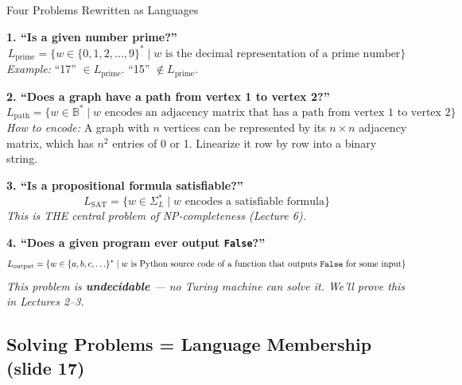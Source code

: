 \documentclass[11pt,a4paper]{article}
\begin{document}
\begin{examplebox}{Four Problems Rewritten as Languages}

\textbf{1. ``Is a given number prime?''}
$$L_{\text{prime}} = \{w \in \{0, 1, 2, \ldots, 9\}^* \mid w \text{ is the decimal representation of a prime number}\}$$
\textit{Example:} ``17'' $\in L_{\text{prime}}$. ``15'' $\notin L_{\text{prime}}$.

\textbf{2. ``Does a graph have a path from vertex 1 to vertex 2?''}
$$L_{\text{path}} = \{w \in \mathbb{B}^* \mid w \text{ encodes an adjacency matrix that has a path from vertex 1 to vertex 2}\}$$
\textit{How to encode:} A graph with $n$ vertices can be represented by its $n \times n$ adjacency matrix, which has $n^2$ entries of 0 or 1. Linearize it row by row into a binary string.

\textbf{3. ``Is a propositional formula satisfiable?''}
$$L_{\text{SAT}} = \{w \in \Sigma_L^* \mid w \text{ encodes a satisfiable formula}\}$$
\textit{This is THE central problem of NP-completeness (Lecture 6).}

\textbf{4. ``Does a given program ever output \texttt{False}?''}
$$L_{\text{output}} = \{w \in \{a, b, c, \ldots\}^* \mid w \text{ is Python source code of a function that outputs \texttt{False} for some input}\}$$
\textit{This problem is \textbf{undecidable} --- no Turing machine can solve it. We'll prove this in Lectures 2--3.}
\end{examplebox}

\subsection{Solving Problems = Language Membership (slide 17)}
\end{document}
